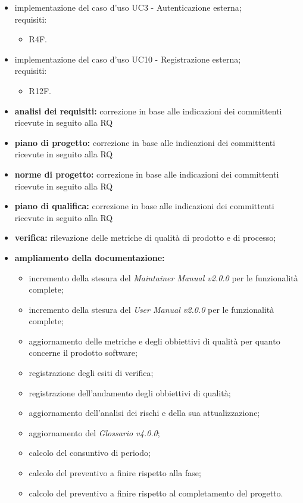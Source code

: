 \begin{itemize}
    \item implementazione del caso d'uso UC3 - Autenticazione esterna;\\requisiti:
          \begin{itemize}
              \item R4F.
          \end{itemize}
    \item implementazione del caso d'uso UC10 - Registrazione esterna;\\requisiti:
          \begin{itemize}
              \item R12F.
          \end{itemize}
    \item \textbf{analisi dei requisiti:} correzione in base alle indicazioni dei committenti ricevute in seguito alla RQ
    \item \textbf{piano di progetto:} correzione in base alle indicazioni dei committenti ricevute in seguito alla RQ
    \item \textbf{norme di progetto:} correzione in base alle indicazioni dei committenti ricevute in seguito alla RQ
    \item \textbf{piano di qualifica:} correzione in base alle indicazioni dei committenti ricevute in seguito alla RQ
    \item \textbf{verifica:} rilevazione delle metriche di qualità di prodotto e di processo;
    \item \textbf{ampliamento della documentazione:}
          \begin{itemize}
              \item incremento della stesura del \textit{Maintainer Manual v2.0.0} per le funzionalità complete;
              \item incremento della stesura del \textit{User Manual v2.0.0} per le funzionalità complete;
              \item aggiornamento delle metriche e degli obbiettivi di qualità per quanto concerne il prodotto software;
              \item registrazione degli esiti di verifica;
              \item registrazione dell'andamento degli obbiettivi di qualità;
              \item aggiornamento dell'analisi dei rischi e della sua attualizzazione;
              \item aggiornamento del \textit{Glossario v4.0.0};
              \item calcolo del consuntivo di periodo;
              \item calcolo del preventivo a finire rispetto alla fase;
              \item calcolo del preventivo a finire rispetto al completamento del progetto.
          \end{itemize}
\end{itemize}
